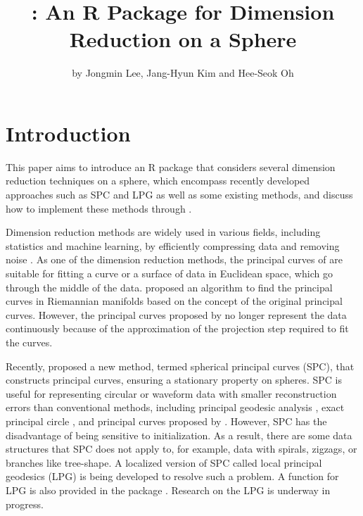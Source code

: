 %

\title{: An R Package for Dimension Reduction on a Sphere}
\author{by Jongmin Lee, Jang-Hyun Kim and Hee-Seok Oh}

\maketitle



\section{Introduction}
This paper aims to introduce an R package  that considers several dimension reduction techniques on a sphere, which encompass recently developed approaches such as SPC and LPG as well as some existing methods, and discuss  how to implement these methods through .  

Dimension reduction methods are widely used in various fields, including statistics and machine learning, by efficiently compressing data and removing noise \citep{Benner2005}. As one of the dimension reduction methods, the principal curves of \citet{Hastie1989} are suitable for fitting a curve or a surface of data in Euclidean space, which go through the middle of the data. \citet{Hauberg2016} proposed an algorithm to find the principal curves in Riemannian manifolds based on the concept of the original principal curves. However, the principal curves proposed by \citet{Hauberg2016} no longer represent the data continuously because of the approximation of the projection step required to fit the curves. 

Recently, \citet{Lee2021} proposed a new method, termed spherical principal curves (SPC), that constructs principal curves, ensuring a stationary property on spheres. SPC is useful for representing circular or waveform data with smaller reconstruction errors than conventional methods, including principal geodesic analysis \citep{Fletcher2004}, exact principal circle \citep{Lee2021}, and principal curves proposed by \citet{Hauberg2016}. However, SPC has the disadvantage of being sensitive to initialization. As a result, there are some data structures that SPC does not apply to, for example, data with spirals, zigzags, or branches like tree-shape. A localized version of SPC called local principal geodesics (LPG) is being developed to resolve such a problem. A function for LPG is also provided in the package . Research on the LPG is underway in progress. 

